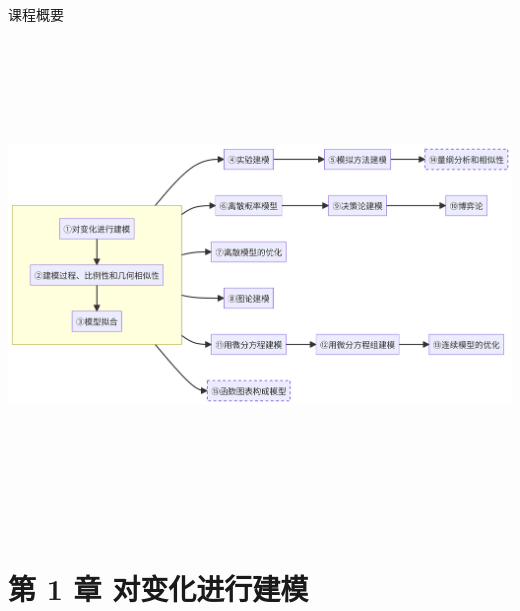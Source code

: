 \documentclass[
  ignorenonframetext,
]{ctexbeamer}
\begin{document}
\begin{frame}{课程概要}
\label{ux8bfeux7a0bux6982ux8981}
\includegraphics[width=10.08in,height=5.21in]{index_files/figure-beamer/mermaid-figure-1.png}
\end{frame}

\section{第 1 章
对变化进行建模}\label{ux7b2c-1-ux7ae0-ux5bf9ux53d8ux5316ux8fdbux884cux5efaux6a21}
\end{document}
